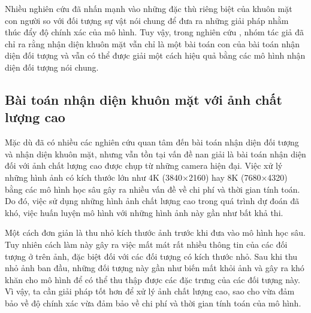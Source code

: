 {    \noindent
    Nhiều nghiên cứu đã nhấn mạnh vào những đặc thù riêng biệt của khuôn mặt con người so với đối tượng sự vật nói chung để đưa ra những giải pháp nhằm thúc đẩy độ chính xác của mô hình.
    Tuy vậy, trong nghiên cứu \cite{zhu2020tinaface}, nhóm tác giả đã chỉ ra rằng nhận diện khuôn mặt vẫn chỉ là một bài toán con của bài toán nhận diện đối tượng và vẫn có thể được giải một cách hiệu quả bằng các mô hình nhận diện đối tượng nói chung.

    \subsection*{Bài toán nhận diện khuôn mặt với ảnh chất lượng cao}
    Mặc dù đã có nhiều các nghiên cứu quan tâm đến bài toán nhận diện đối tượng và nhận diện khuôn mặt, nhưng vẫn tồn tại vấn đề nan giải là bài toán nhận diện đối với ảnh chất lượng cao được chụp từ những camera hiện đại.
    Việc xử lý những hình ảnh có kích thước lớn như 4K (3840×2160) hay 8K (7680×4320) bằng các mô hình học sâu gây ra nhiều vấn đề về chi phí và thời gian tính toán.
    Do đó, việc sử dụng những hình ảnh chất lượng cao trong quá trình dự đoán đã khó, việc huấn luyện mô hình với những hình ảnh này gần như bất khả thi.

    \noindent
    Một cách đơn giản là thu nhỏ kích thước ảnh trước khi đưa vào mô hình học sâu.
    Tuy nhiên cách làm này gây ra việc mất mát rất nhiều thông tin của các đối tượng ở trên ảnh, đặc biệt đối với các đối tượng có kích thước nhỏ.
    Sau khi thu nhỏ ảnh ban đầu, những đối tượng này gần như biến mất khỏi ảnh và gây ra khó khăn cho mô hình để có thể thu thập được các đặc trưng của các đối tượng này.
    Vì vậy, ta cần giải pháp tốt hơn để xử lý ảnh chất lượng cao, sao cho vừa đảm bảo về độ chính xác vừa đảm bảo về chi phí và thời gian tính toán của mô hình.
}